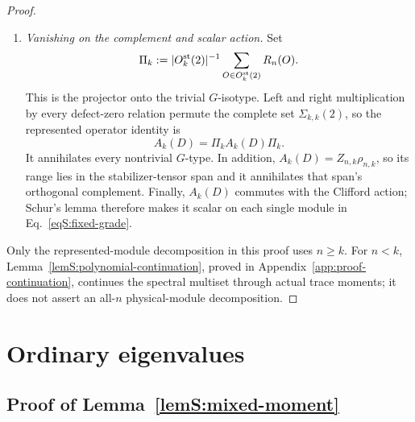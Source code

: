 \documentclass[journal,twocolumn]{IEEEtran}
\theoremstyle{definition}
\theoremstyle{plain}
\begin{document}
\begin{proof}
\begin{enumerate}
\item \emph{Vanishing on the complement and scalar action.}
Set
\begin{equation}
 \Pi_k:=|O_k^{\rm st}(2)|^{-1}
 \sum_{O\in O_k^{\rm st}(2)}R_n(O).
\end{equation}
This is the projector onto the trivial $G$-isotype.  Left and right
multiplication by every defect-zero relation permute the complete set
$\Sigma_{k,k}(2)$, so the represented operator identity is
\begin{equation}
 A_k(D)=\Pi_kA_k(D)\Pi_k.
 \label{eqS:bi-invariance}
\end{equation}
It annihilates every nontrivial $G$-type.  In addition,
$A_k(D)=Z_{n,k}\rho_{n,k}$, so its range lies in the stabilizer-tensor span
and it annihilates that span's orthogonal complement.  Finally, $A_k(D)$
commutes with the Clifford action; Schur's lemma therefore makes it scalar on
each single module in Eq.~\eqref{eqS:fixed-grade}.
\end{enumerate}

Only the represented-module decomposition in this proof uses $n\geq k$.
For $n<k$, Lemma~\ref{lemS:polynomial-continuation}, proved in
Appendix~\ref{app:proof-continuation}, continues the spectral multiset
through actual trace moments; it does not assert an all-$n$
physical-module decomposition.
\end{proof}

\section{Ordinary eigenvalues}
\label{app:ordinary}

\subsection{Proof of Lemma~\ref{lemS:mixed-moment}}
\label{app:proof-mixed-moment}
\end{document}
